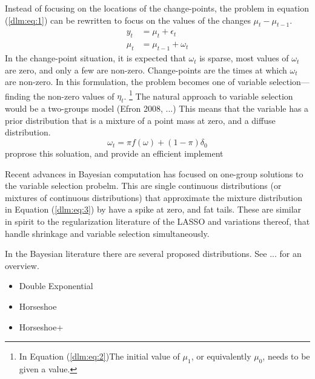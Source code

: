 Instead of focusing on the locations of the change-points, the problem in equation (\ref{dlm:eq:1}) can be rewritten to focus on the values of the changes $\mu_{t} - \mu_{t - 1}$.
\begin{equation}
  \label{dlm:eq:2}
  \begin{aligned}
    y_{t} &= \mu_{t} + \epsilon_{t} \\
    \mu_{t} &= \mu_{t - 1} + \omega_{t}
  \end{aligned}
\end{equation}
In the change-point situation, it is expected that $\omega_{t}$ is sparse, \ie{}most values of $\omega_{t}$ are zero, and only a few are non-zero.
Change-points are the times at which $\omega_{t}$ are non-zero.
In this formulation, the problem becomes one of variable selection---finding the non-zero values of $\eta_{t}$.%
\footnote{In Equation (\ref{dlm:eq:2})The initial value of $\mu_{1}$, or equivalently $\mu_{0}$, needs to be given a value.
}
The natural approach to variable selection would be a two-groups model (Efron 2008, ...)
This means that the variable has a prior distribution that is a mixture of a point mass at zero, and a diffuse distribution.
\begin{equation}
  \label{dlm:eq:3}
  \omega_{t} = \pi f(\omega) + (1 - \pi) \delta_{0}
\end{equation}
\textcite{GiordaniKohn2008} proprose this soluation, and provide an efficient implement

Recent advances in Bayesian computation has focused on one-group solutions to the variable selection probelm.
This are single continuous distributions (or mixtures of continuous distributions) that approximate the mixture distribution in Equation (\ref{dlm:eq:3}) by have a spike at zero, and fat tails.
These are similar in spirit to the regularization literature of the LASSO and variations thereof, that handle shrinkage and variable selection simultaneously.

In the Bayesian literature there are several proposed distributions.
See ... for an overview.

\begin{itemize}
\item Double Exponential
\item Horseshoe
\item Horseshoe+ 
\end{itemize}


